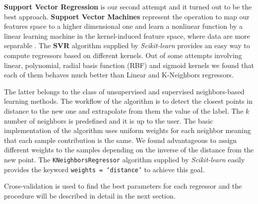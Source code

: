 \textbf{Support Vector Regression} is our second attempt and it turned out to be the best approach.
\textbf{Support Vector Machines} represent the operation to map our features space to a higher dimensional one and learn a nonlinear function by a linear learning machine in the kernel-induced feature space, where data are more separable \cite{yang2008regression}.
The \textbf{SVR} algorithm supplied by \textit{Scikit-learn} provides an easy way to compute regressors based on different kernels.
Out of some attempts involving linear, polynomial, radial basis function (RBF) and sigmoid kernels we found that each of them behaves much better than Linear and K-Neighbors regressors. 

The latter belongs to the class of unsupervised and supervised neighbors-based learning methods.
The workflow of the algorithm is to detect the closest points in distance to the new one and extrapolate from them the value of the label.
The $k$ number of neighbors is predefined and it is up to the user. 
The basic implementation of the algorithm uses uniform weights for each neighbor meaning that each sample contribution is the same.
We found advantageous to assign different weights to the samples depending on the inverse of the distance from the new point.
The \texttt{KNeighborsRegressor} algorithm supplied by \textit{Scikit-learn} easily provides the keyword \texttt{weights = `distance'} to achieve this goal. 

Cross-validation is used to find the best parameters for each regressor and the procedure will be described in detail in the next section.
